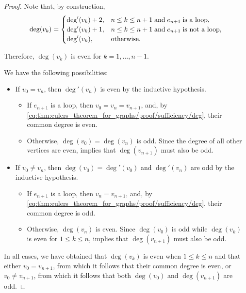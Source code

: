 \begin{proof}
  Note that, by construction,
  \begin{equation}\label{eq:thm:eulers_theorem_for_graphs/proof/sufficiency/deg}
    \deg(v_k) = \begin{cases}
      \deg'(v_k) + 2, &n \leq k \leq n + 1 \T{and} e_{n+1} \T{is a loop}, \\
      \deg'(v_k) + 1, &n \leq k \leq n + 1 \T{and} e_{n+1} \T{is not a loop}, \\
      \deg'(v_k),     &\T{otherwise.}
    \end{cases}
  \end{equation}

  Therefore, \( \deg(v_k) \) is even for \( k = 1, \ldots, n - 1 \).

  We have the following possibilities:
  \begin{itemize}
    \item If \( v_0 = v_n \), then \( \deg'(v_n) \) is even by the inductive hypothesis.
    \begin{itemize}
      \item If \( e_{n+1} \) is a loop, then \( v_0 = v_n = v_{n+1} \), and, by \eqref{eq:thm:eulers_theorem_for_graphs/proof/sufficiency/deg}, their common degree is even.

      \item Otherwise, \( \deg(v_0) = \deg(v_n) \) is odd. Since the degree of all other vertices are even,  implies that \( \deg(v_{n+1}) \) must also be odd.
    \end{itemize}

    \item If \( v_0 \neq v_n \), then \( \deg(v_0) = \deg'(v_0) \) and \( \deg'(v_n) \) are odd by the inductive hypothesis.
    \begin{itemize}
      \item If \( e_{n+1} \) is a loop, then \( v_n = v_{n+1} \), and, by \eqref{eq:thm:eulers_theorem_for_graphs/proof/sufficiency/deg}, their common degree is odd.

      \item Otherwise, \( \deg(v_n) \) is even. Since \( \deg(v_0) \) is odd while \( \deg(v_k) \) is even for \( 1 \leq k \leq n \),  implies that \( \deg(v_{n+1}) \) must also be odd.
    \end{itemize}
  \end{itemize}

  In all cases, we have obtained that \( \deg(v_k) \) is even when \( 1 \leq k \leq n \) and that either \( v_0 = v_{n+1} \), from which it follows that their common degree is even, or \( v_0 \neq v_{n+1} \), from which it follows that both \( \deg(v_0) \) and \( \deg(v_{n+1}) \) are odd.


\end{proof}

